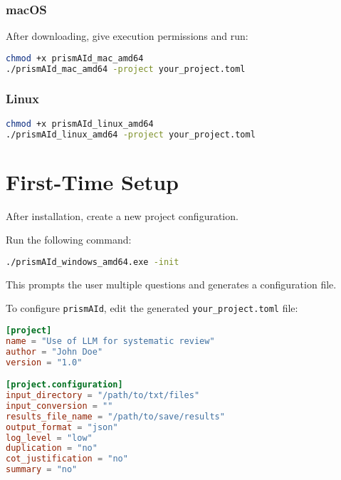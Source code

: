\subsubsection{macOS}
\begin{commandbox}
After downloading, give execution permissions and run:
\begin{lstlisting}[language=Bash]
chmod +x prismAId_mac_amd64
./prismAId_mac_amd64 -project your_project.toml
\end{lstlisting}
\end{commandbox}

\subsubsection{Linux}
\begin{commandbox}
\begin{lstlisting}[language=Bash]
chmod +x prismAId_linux_amd64
./prismAId_linux_amd64 -project your_project.toml
\end{lstlisting}
\end{commandbox}


\section{First-Time Setup}

After installation, create a new project configuration.

\begin{commandbox}
Run the following command:
\begin{lstlisting}[language=Bash]
./prismAId_windows_amd64.exe -init
\end{lstlisting}
\end{commandbox}

This prompts the user multiple questions and generates a configuration file.

\begin{configbox}
To configure \texttt{prismAId}, edit the generated \texttt{your\_project.toml} file:
\begin{lstlisting}[language=TOML]
[project]
name = "Use of LLM for systematic review"
author = "John Doe"
version = "1.0"

[project.configuration]
input_directory = "/path/to/txt/files"
input_conversion = ""
results_file_name = "/path/to/save/results"
output_format = "json"
log_level = "low"
duplication = "no"
cot_justification = "no"
summary = "no"
\end{lstlisting}
\end{configbox}

